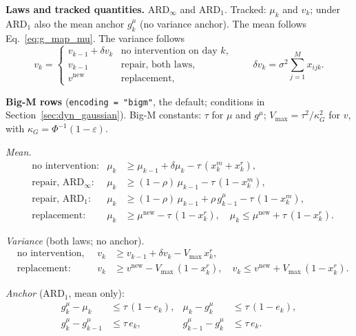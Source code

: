 \documentclass[11pt,a4paper]{article}
\theoremstyle{plain}
\theoremstyle{definition}
\newcommand{\ARDinf}{\mathrm{ARD}_{\infty}}
\newcommand{\ARDone}{\mathrm{ARD}_{1}}
\newcommand{\new}{\mathrm{new}}
\renewcommand{\_}{\textunderscore\allowbreak{}}
\begin{document}
\textbf{Laws and tracked quantities.} $\ARDinf$ and $\ARDone$. Tracked: $\mu_k$ and
$v_k$; under $\ARDone$ also the mean anchor $g^{\mu}_k$ (no variance anchor). The
mean follows Eq.~\eqref{eq:g_map_mu}. The variance follows
\begin{equation}
  v_k = \begin{cases}
    v_{k-1} + \delta v_k & \text{no intervention on day } k,\\
    v_{k-1} & \text{repair, both laws},\\
    v^{\new} & \text{replacement,}
  \end{cases}
  \qquad \delta v_k = \sigma^2 \sum_{j=1}^{M} x_{ijk}.
  \label{eq:w_map_v}
\end{equation}

\textbf{Big-M rows} (\texttt{encoding = "bigm"}, the default; conditions in
Section~\ref{sec:dyn_gaussian}). Big-M constants: $\tau$ for $\mu$ and $g^{\mu}$;
$V_{\max} = \tau^2/\kappa_G^2$ for $v$, with $\kappa_G = \Phi^{-1}(1-\varepsilon)$.

\emph{Mean.}
\begin{align}
  &\text{no intervention:} & \mu_k &\geq \mu_{k-1} + \delta\mu_k - \tau\,(x^m_k + x^r_k),
    \label{eq:w_mu_carry} \\
  &\text{repair, } \ARDinf\text{:} & \mu_k &\geq (1-\rho)\,\mu_{k-1} - \tau\,(1 - x^m_k),
    \label{eq:w_mu_inf} \\
  &\text{repair, } \ARDone\text{:} & \mu_k &\geq (1-\rho)\,\mu_{k-1} + \rho\, g^{\mu}_{k-1}
    - \tau\,(1 - x^m_k),
    \label{eq:w_mu_one} \\
  &\text{replacement:} & \mu_k &\geq \mu^{\new} - \tau\,(1 - x^r_k), \quad
    \mu_k \leq \mu^{\new} + \tau\,(1 - x^r_k).
    \label{eq:w_mu_repl}
\end{align}

\emph{Variance} (both laws; no anchor).
\begin{align}
  &\text{no intervention, repair:} & v_k &\geq v_{k-1} + \delta v_k - V_{\max}\, x^r_k,
    \label{eq:w_vrow} \\
  &\text{replacement:} & v_k &\geq v^{\new} - V_{\max}\,(1 - x^r_k), \quad
    v_k \leq v^{\new} + V_{\max}\,(1 - x^r_k).
    \label{eq:w_v_repl}
\end{align}

\emph{Anchor} ($\ARDone$, mean only):
\begin{align}
  g^{\mu}_k - \mu_k &\leq \tau\,(1 - e_k), & \mu_k - g^{\mu}_k &\leq \tau\,(1 - e_k),
    \label{eq:w_anchor_set} \\
  g^{\mu}_k - g^{\mu}_{k-1} &\leq \tau\, e_k, & g^{\mu}_{k-1} - g^{\mu}_k &\leq \tau\, e_k.
    \label{eq:w_anchor_keep}
\end{align}
\end{document}
